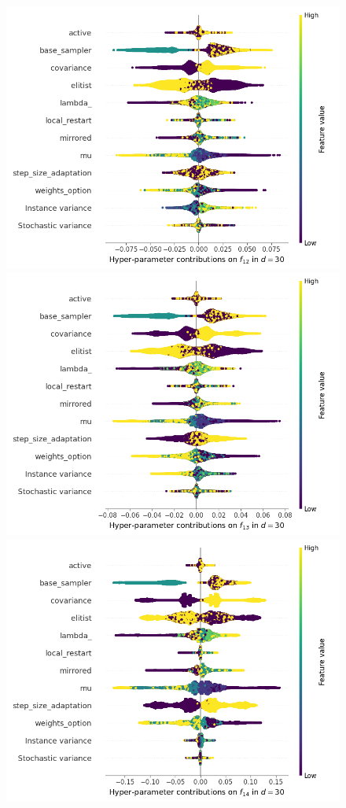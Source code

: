 \begin{figure}[t]
	\includegraphics[height=0.15\textheight,trim=60mm 0mm 0mm 0mm,clip]{cma_img_new/img_summary_f12_d30.png}
	\includegraphics[height=0.15\textheight,trim=0mm 0mm 30mm 0mm,clip]{cma_img_new/img_summary_f13_d30.png}
	\includegraphics[height=0.15\textheight,trim=60mm 0mm 30mm 0mm,clip]{cma_img_new/img_summary_f14_d30.png}

\end{figure}
